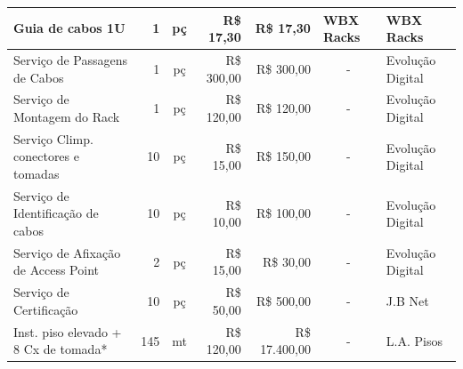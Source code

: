 \documentclass[	DIV=calc,%
							paper=a4,%
							fontsize=12pt,%
							onecolumn]{scrartcl}	 					%
\begin{document}
\begin{table}[H]
{\begin{tabular}{lrcrrll}
		\multicolumn{1}{|l|}{Guia de cabos 1U}                     & \multicolumn{1}{r|}{1}             & \multicolumn{1}{c|}{pç}            & \multicolumn{1}{r|}{R\$ 17,30}            & \multicolumn{1}{r|}{R\$ 17,30}         & \multicolumn{1}{l|}{WBX Racks}      & \multicolumn{1}{l|}{WBX Racks}            \\ \hline
		\multicolumn{1}{|l|}{Serviço de Passagens de Cabos}        & \multicolumn{1}{r|}{1}             & \multicolumn{1}{c|}{pç}            & \multicolumn{1}{r|}{R\$ 300,00}           & \multicolumn{1}{r|}{R\$ 300,00}        & \multicolumn{1}{c|}{-}              & \multicolumn{1}{l|}{Evolução Digital}     \\ \hline
		\multicolumn{1}{|l|}{Serviço de Montagem do Rack}          & \multicolumn{1}{r|}{1}             & \multicolumn{1}{c|}{pç}            & \multicolumn{1}{r|}{R\$ 120,00}           & \multicolumn{1}{r|}{R\$ 120,00}        & \multicolumn{1}{c|}{-}              & \multicolumn{1}{l|}{Evolução Digital}     \\ \hline
		\multicolumn{1}{|l|}{Serviço Climp. conectores e tomadas}  & \multicolumn{1}{r|}{10}            & \multicolumn{1}{c|}{pç}            & \multicolumn{1}{r|}{R\$ 15,00}            & \multicolumn{1}{r|}{R\$ 150,00}        & \multicolumn{1}{c|}{-}              & \multicolumn{1}{l|}{Evolução Digital}     \\ \hline
		\multicolumn{1}{|l|}{Serviço de Identificação de cabos}    & \multicolumn{1}{r|}{10}            & \multicolumn{1}{c|}{pç}            & \multicolumn{1}{r|}{R\$ 10,00}            & \multicolumn{1}{r|}{R\$ 100,00}        & \multicolumn{1}{c|}{-}              & \multicolumn{1}{l|}{Evolução Digital}     \\ \hline
		\multicolumn{1}{|l|}{Serviço de Afixação de Access Point}  & \multicolumn{1}{r|}{2}             & \multicolumn{1}{c|}{pç}            & \multicolumn{1}{r|}{R\$ 15,00}            & \multicolumn{1}{r|}{R\$ 30,00}         & \multicolumn{1}{c|}{-}              & \multicolumn{1}{l|}{Evolução Digital}     \\ \hline
		\multicolumn{1}{|l|}{Serviço de Certificação}              & \multicolumn{1}{r|}{10}            & \multicolumn{1}{c|}{pç}            & \multicolumn{1}{r|}{R\$ 50,00}            & \multicolumn{1}{r|}{R\$ 500,00}        & \multicolumn{1}{c|}{-}              & \multicolumn{1}{l|}{J.B Net}              \\ \hline
		\multicolumn{1}{|l|}{Inst. piso elevado + 8 Cx de tomada*} & \multicolumn{1}{r|}{145}           & \multicolumn{1}{c|}{mt}            & \multicolumn{1}{r|}{R\$ 120,00}           & \multicolumn{1}{r|}{R\$ 17.400,00}     & \multicolumn{1}{c|}{-}              & \multicolumn{1}{l|}{L.A. Pisos}           \\ \hline

\end{tabular}}
\end{table}
\end{document}
